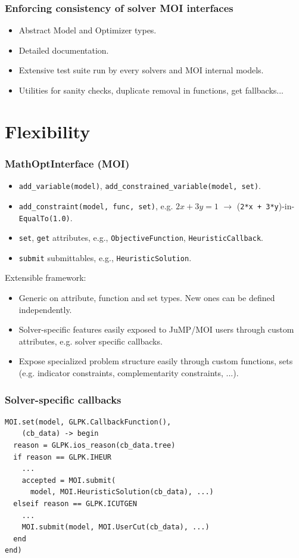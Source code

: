 \documentclass{beamer}
\begin{document}
  \begin{frame}
    \frametitle{Enforcing consistency of solver MOI interfaces}
    \begin{itemize}
      \item Abstract Model and Optimizer types.
      \item Detailed documentation.
      \item Extensive test suite run by every solvers and MOI internal models.
      \item Utilities for sanity checks, duplicate removal in functions, get fallbacks...
    \end{itemize}
  \end{frame}

\section{Flexibility}

  \begin{frame}[fragile]
    \frametitle{MathOptInterface (MOI)}
    \begin{itemize}
      \item \verb|add_variable(model)|, \verb|add_constrained_variable(model, set)|.
      \item \verb|add_constraint(model, func, set)|, e.g. $2x + 3y = 1$ $\to$ (\verb|2*x + 3*y|)-in-\verb|EqualTo(1.0)|.
      \item \verb|set|, \verb|get| attributes, e.g., \verb|ObjectiveFunction|, \verb|HeuristicCallback|.
      \item \verb|submit| submittables, e.g., \verb|HeuristicSolution|.
    \end{itemize}
    Extensible framework:
    \begin{itemize}
      \item \alert{Generic} on attribute, function and set types. New ones can be defined \alert{independently}.
      \item Solver-\alert{specific} features easily exposed to JuMP/MOI users through \alert{custom} attributes, e.g. solver specific callbacks.
      \item Expose \alert{specialized} problem structure easily through \alert{custom} functions, sets (e.g. indicator constraints, complementarity constraints, ...).
    \end{itemize}
  \end{frame}

  \begin{frame}[fragile]
    \frametitle{Solver-specific callbacks}
\begin{verbatim}
MOI.set(model, GLPK.CallbackFunction(),
	(cb_data) -> begin
  reason = GLPK.ios_reason(cb_data.tree)
  if reason == GLPK.IHEUR
    ...
    accepted = MOI.submit(
      model, MOI.HeuristicSolution(cb_data), ...)
  elseif reason == GLPK.ICUTGEN
    ...
    MOI.submit(model, MOI.UserCut(cb_data), ...)
  end
end)
\end{verbatim}
  \end{frame}
\end{document}
